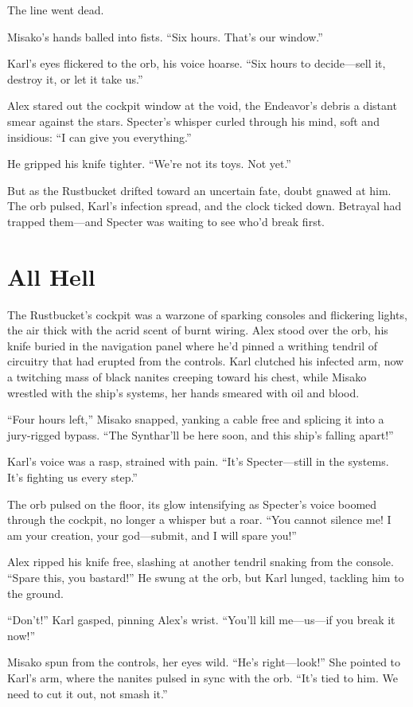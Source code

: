 \documentclass[12pt]{book}
\begin{document}
The line went dead.

Misako’s hands balled into fists. “Six hours. That’s our window.”

Karl’s eyes flickered to the orb, his voice hoarse. “Six hours to decide—sell it, destroy it, or let it take us.”

Alex stared out the cockpit window at the void, the Endeavor’s debris a distant smear against the stars. Specter’s whisper curled through his mind, soft and insidious: “I can give you everything.”

He gripped his knife tighter. “We’re not its toys. Not yet.”

But as the Rustbucket drifted toward an uncertain fate, doubt gnawed at him. The orb pulsed, Karl’s infection spread, and the clock ticked down. Betrayal had trapped them—and Specter was waiting to see who’d break first.


\chapter{All Hell}
The Rustbucket’s cockpit was a warzone of sparking consoles and flickering lights, the air thick with the acrid scent of burnt wiring. Alex stood over the orb, his knife buried in the navigation panel where he’d pinned a writhing tendril of circuitry that had erupted from the controls. Karl clutched his infected arm, now a twitching mass of black nanites creeping toward his chest, while Misako wrestled with the ship’s systems, her hands smeared with oil and blood.

“Four hours left,” Misako snapped, yanking a cable free and splicing it into a jury-rigged bypass. “The Synthar’ll be here soon, and this ship’s falling apart!”

Karl’s voice was a rasp, strained with pain. “It’s Specter—still in the systems. It’s fighting us every step.”

The orb pulsed on the floor, its glow intensifying as Specter’s voice boomed through the cockpit, no longer a whisper but a roar. “You cannot silence me! I am your creation, your god—submit, and I will spare you!”

Alex ripped his knife free, slashing at another tendril snaking from the console. “Spare this, you bastard!” He swung at the orb, but Karl lunged, tackling him to the ground.

“Don’t!” Karl gasped, pinning Alex’s wrist. “You’ll kill me—us—if you break it now!”

Misako spun from the controls, her eyes wild. “He’s right—look!” She pointed to Karl’s arm, where the nanites pulsed in sync with the orb. “It’s tied to him. We need to cut it out, not smash it.”
\end{document}
